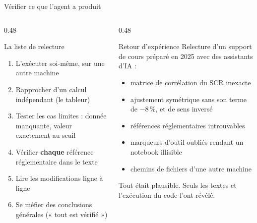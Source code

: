 \documentclass[10pt,aspectratio=169]{beamer}
\begin{document}
\begin{frame}{Vérifier ce que l'agent a produit}
\begin{columns}[T]
\begin{column}{0.48\textwidth}
\begin{block}{La liste de relecture}
\begin{enumerate}
  \item L'exécuter soi-même, sur une autre machine
  \item Rapprocher d'un calcul indépendant (le tableur)
  \item Tester les cas limites : donnée manquante, valeur exactement au seuil
  \item Vérifier \textbf{chaque} référence réglementaire dans le texte
  \item Lire les modifications ligne à ligne
  \item Se méfier des conclusions générales (« tout est vérifié »)
\end{enumerate}
\end{block}
\end{column}
\begin{column}{0.48\textwidth}
\begin{alertblock}{Retour d'expérience}
\small
Relecture d'un support de cours préparé en 2025 avec des assistants d'IA :
\begin{itemize}
  \item matrice de corrélation du SCR inexacte
  \item ajustement symétrique sans son terme de $-8\,\%$, et de sens inversé
  \item références réglementaires introuvables
  \item marqueurs d'outil oubliés rendant un notebook illisible
  \item chemins de fichiers d'une autre machine
\end{itemize}
Tout était plausible. Seuls les textes et l'exécution du code l'ont révélé.
\end{alertblock}
\end{column}
\end{columns}
\end{frame}
\end{document}
